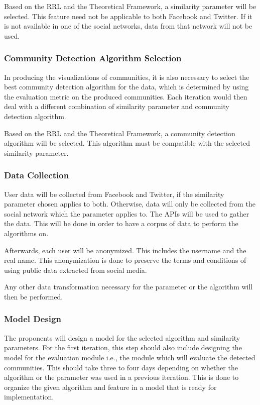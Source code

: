 Based on the RRL and the Theoretical Framework, a similarity parameter will be selected. This feature need not be applicable to both Facebook and Twitter. If it is not available in one of the social networks, data from that network will not be used.

\subsubsection{Community Detection Algorithm Selection}

In producing the visualizations of communities, it is also necessary to select the best community detection algorithm for the data, which is determined by using the evaluation metric on the produced communities. Each iteration would then deal with a different combination of similarity parameter and community detection algorithm.

Based on the RRL and the Theoretical Framework, a community detection algorithm will be selected. This algorithm must be compatible with the selected similarity parameter.

\subsubsection{Data Collection}

User data will be collected from Facebook and Twitter, if the similarity parameter chosen applies to both. Otherwise, data will only be collected from the social network which the parameter applies to. The API\vtick s will be used to gather the data. This will be done in order to have a corpus of data to perform the algorithms on.

Afterwards, each user will be anonymized. This includes the username and the real name.  This anonymization is done to preserve the terms and conditions of using public data extracted from social media. 

Any other data transformation necessary for the parameter or the algorithm will then be performed.

\subsubsection{Model Design}

The proponents will design a model for the selected algorithm and similarity parameters. For the first iteration, this step should also include designing the model for the evaluation module i.e., the module which will evaluate the detected communities. This should take three to four days depending on whether the algorithm or the parameter was used in a previous iteration. This is done to organize the given algorithm and feature in a model that is ready for implementation.

